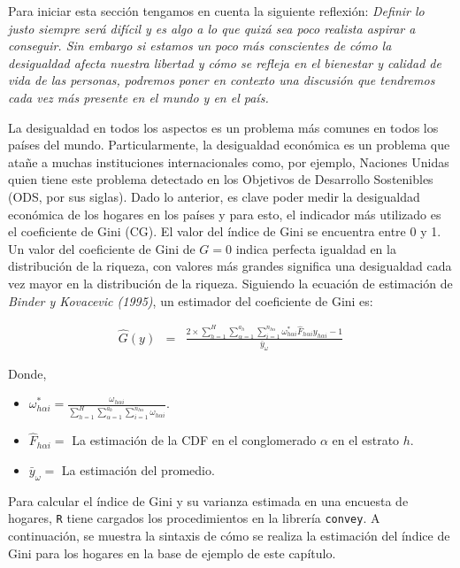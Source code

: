 \documentclass[
  12pt,
]{book}
\begin{document}
Para iniciar esta sección tengamos en cuenta la siguiente reflexión: \emph{Definir lo justo siempre será difícil y es algo a lo que quizá sea poco realista aspirar a conseguir. Sin embargo si estamos un poco más conscientes de cómo la desigualdad afecta nuestra libertad y cómo se refleja en el bienestar y calidad de vida de las personas, podremos poner en contexto una discusión que tendremos cada vez más presente en el mundo y en el país.}

La desigualdad en todos los aspectos es un problema más comunes en todos los países del mundo. Particularmente, la desigualdad económica es un problema que atañe a muchas instituciones internacionales como, por ejemplo, Naciones Unidas quien tiene este problema detectado en los Objetivos de Desarrollo Sostenibles (ODS, por sus siglas). Dado lo anterior, es clave poder medir la desigualdad económica de los hogares en los países y para esto, el indicador más utilizado es el coeficiente de Gini (CG). El valor del índice de Gini se encuentra entre 0 y 1. Un valor del coeficiente de Gini de \(G = 0\) indica perfecta igualdad en la distribución de la riqueza, con valores más grandes significa una desigualdad cada vez mayor en la distribución de la riqueza. Siguiendo la ecuación de estimación de \emph{Binder y Kovacevic (1995)}, un estimador del coeficiente de Gini es:

\begin{eqnarray*}
\hat{G}\left(y\right) & = & \frac{2\times\sum_{h=1}^{H}\sum_{\alpha=1}^{a_{h}}\sum_{i=1}^{n_{h\alpha}}\omega_{h\alpha i}^{*}\hat{F}_{h\alpha i}y_{h\alpha i}-1}{\bar{y}_{\omega}}
\end{eqnarray*}

Donde,

\begin{itemize}
\item
  \(\omega_{h\alpha i}^{*}=\frac{\omega_{h\alpha i}}{\sum_{h=1}^{H}\sum_{\alpha=1}^{a_{h}}\sum_{i=1}^{n_{h\alpha}}\omega_{h\alpha i}}\).
\item
  \(\hat{F}_{h\alpha i}=\) La estimación de la CDF en el conglomerado \(\alpha\) en el estrato \(h\).
\item
  \(\bar{y}_{\omega}=\) La estimación del promedio.
\end{itemize}

Para calcular el índice de Gini y su varianza estimada en una encuesta de hogares, \texttt{R} tiene cargados los procedimientos en la librería \texttt{convey}. A continuación, se muestra la sintaxis de cómo se realiza la estimación del índice de Gini para los hogares en la base de ejemplo de este capítulo.
\end{document}
